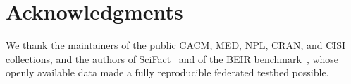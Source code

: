 \documentclass[preprint,12pt]{elsarticle}
\begin{document}
\section*{Acknowledgments}
We thank the maintainers of the public CACM, MED, NPL, CRAN, and CISI
collections, and the authors of SciFact~\cite{wadden2020fact} and of the BEIR
benchmark~\cite{thakur2021beir}, whose openly available data made a fully
reproducible federated testbed possible.



\end{document}
